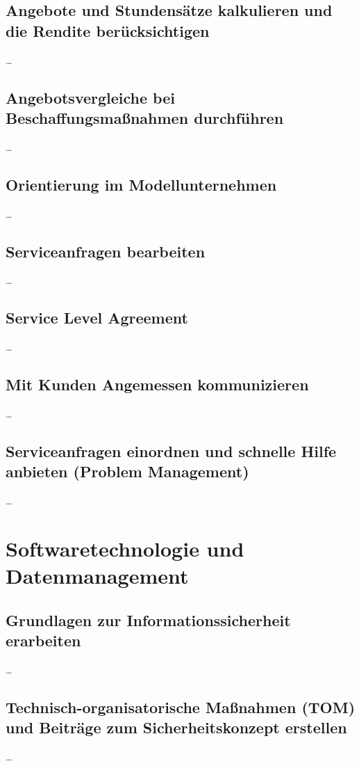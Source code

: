 \documentclass[a4paper, 12pt]{report}
\begin{document}
\section{Angebote und Stundensätze kalkulieren und die Rendite berücksichtigen}
\dots 

\section{Angebotsvergleiche bei Beschaffungsmaßnahmen durchführen}
\dots

\section{Orientierung im Modellunternehmen}
\dots

\section{Serviceanfragen bearbeiten}
\dots

\section{Service Level Agreement}
\dots

\section{Mit Kunden Angemessen kommunizieren}
\dots

\section{Serviceanfragen einordnen und schnelle Hilfe anbieten (Problem Management)}
\dots


\chapter{Softwaretechnologie und Datenmanagement}

\section{Grundlagen zur Informationssicherheit erarbeiten}
\dots

\section{Technisch-organisatorische Maßnahmen (TOM) und Beiträge zum Sicherheitskonzept erstellen}
\dots
\end{document}

